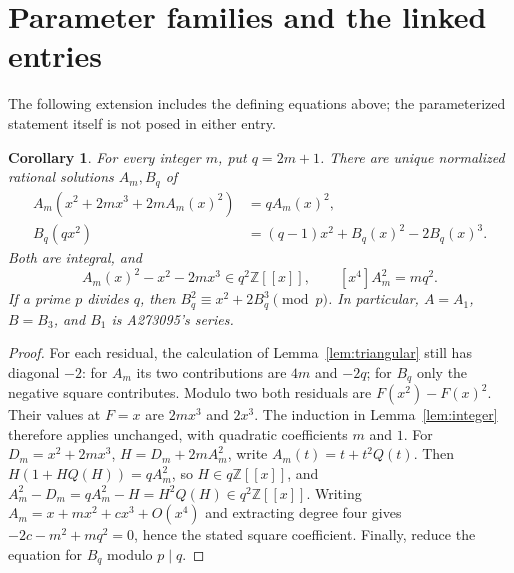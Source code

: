 \documentclass[11pt]{article}
\newtheorem{corollary}[theorem]{Corollary}
\newcommand{\Z}{\mathbb Z}
\newcommand{\coef}[1]{[x^{#1}]}
\begin{document}
\section{Parameter families and the linked entries}
The following extension includes the defining equations above; the
parameterized statement itself is not posed in either entry.
\begin{corollary}\label{cor:odd}
For every integer $m$, put $q=2m+1$. There are unique normalized rational
solutions $A_m,B_q$ of
\begin{align*}
 A_m(x^2+2mx^3+2mA_m(x)^2)&=q A_m(x)^2,\\
 B_q(qx^2)&=(q-1)x^2+B_q(x)^2-2B_q(x)^3.
\end{align*}
Both are integral, and
\[
 A_m(x)^2-x^2-2mx^3\in q^2\Z[[x]],\qquad
 \coef4 A_m^2=mq^2.
\]
If a prime $p$ divides $q$, then
$B_q^2\equiv x^2+2B_q^3\pmod p$.
In particular, $A=A_1$, $B=B_3$, and $B_1$ is A273095's series.
\end{corollary}
\begin{proof}
For each residual, the calculation of Lemma~\ref{lem:triangular} still
has diagonal $-2$: for $A_m$ its two contributions are $4m$ and $-2q$;
for $B_q$ only the negative square contributes. Modulo two both residuals
are $F(x^2)-F(x)^2$. Their values at $F=x$ are $2mx^3$ and $2x^3$.
The induction in Lemma~\ref{lem:integer} therefore applies unchanged,
with quadratic coefficients $m$ and $1$.
For $D_m=x^2+2mx^3$, $H=D_m+2mA_m^2$, write
$A_m(t)=t+t^2Q(t)$. Then
$H(1+HQ(H))=qA_m^2$, so $H\in q\Z[[x]]$, and
$A_m^2-D_m=qA_m^2-H=H^2Q(H)\in q^2\Z[[x]]$.
Writing $A_m=x+mx^2+cx^3+O(x^4)$ and extracting degree four gives
$-2c-m^2+mq^2=0$, hence the stated square coefficient.
Finally, reduce the equation for $B_q$ modulo $p\mid q$.
\end{proof}
\end{document}
